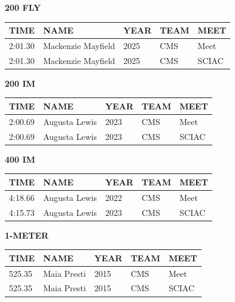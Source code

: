 \begin{table}[H]
\centering
\begin{minipage}[t]{0.48\textwidth}
\centering
\textbf{200 FLY}\\[0.1cm]
\begin{tabular}{@{}p{1.8cm}p{2.8cm}p{1.2cm}p{1.4cm}p{1.4cm}@{}}
\hline
    \textbf{TIME} & \textbf{NAME} & \textbf{YEAR} & \textbf{TEAM} & \textbf{MEET} \\
\hline
    2:01.30 & Mackenzie Mayfield & 2025 & CMS & Meet \\
    2:01.30 & Mackenzie Mayfield & 2025 & CMS & SCIAC \\
\hline
\end{tabular}
\end{minipage}\hfill
\begin{minipage}[t]{0.48\textwidth}
\centering
\textbf{200 IM}\\[0.1cm]
\begin{tabular}{@{}p{1.8cm}p{2.8cm}p{1.2cm}p{1.4cm}p{1.4cm}@{}}
\hline
    \textbf{TIME} & \textbf{NAME} & \textbf{YEAR} & \textbf{TEAM} & \textbf{MEET} \\
\hline
    2:00.69 & Augusta Lewis & 2023 & CMS & Meet \\
    2:00.69 & Augusta Lewis & 2023 & CMS & SCIAC \\
\hline
\end{tabular}
\end{minipage}
\end{table}

\begin{table}[H]
\centering
\begin{minipage}[t]{0.6\textwidth}
\centering
\textbf{400 IM}\\[0.1cm]
\begin{tabular}{@{}p{1.8cm}p{2.8cm}p{1.2cm}p{1.4cm}p{1.4cm}@{}}
\hline
    \textbf{TIME} & \textbf{NAME} & \textbf{YEAR} & \textbf{TEAM} & \textbf{MEET} \\
\hline
    4:18.66 & Augusta Lewis & 2022 & CMS & Meet \\
    4:15.73 & Augusta Lewis & 2023 & CMS & SCIAC \\
\hline
\end{tabular}
\end{minipage}
\end{table}

\begin{table}[H]
\centering
\begin{minipage}[t]{0.6\textwidth}
\centering
\textbf{1-METER}\\[0.1cm]
\begin{tabular}{@{}p{1.8cm}p{2.8cm}p{1.2cm}p{1.4cm}p{1.4cm}@{}}
\hline
    \textbf{TIME} & \textbf{NAME} & \textbf{YEAR} & \textbf{TEAM} & \textbf{MEET} \\
\hline
    525.35 & Maia Presti & 2015 & CMS & Meet \\
    525.35 & Maia Presti & 2015 & CMS & SCIAC \\
\hline
\end{tabular}
\end{minipage}
\end{table}

